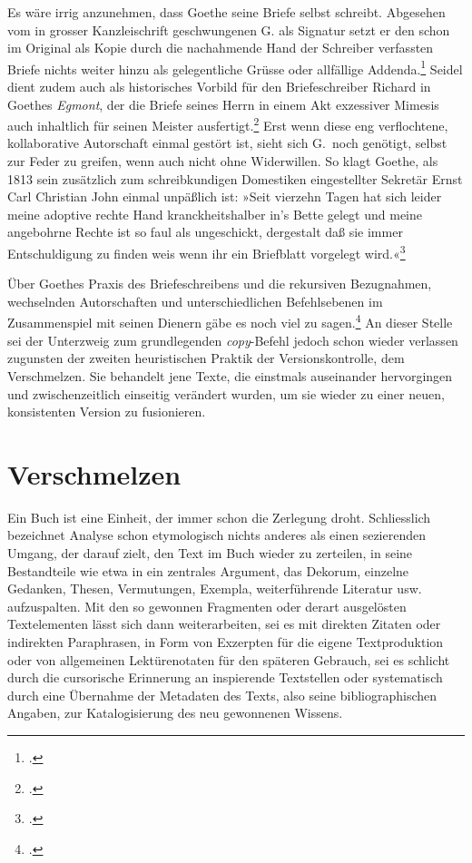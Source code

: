 \documentclass[a4paper,11pt]{article}
\newcommand{\anf}[1]{»#1«}
\begin{document}
Es wäre irrig anzunehmen, dass Goethe seine Briefe selbst schreibt. Abgesehen vom in grosser Kanzleischrift geschwungenen G. als Signatur setzt er den schon im Original als Kopie durch die nachahmende Hand der Schreiber verfassten Briefe nichts weiter hinzu als gelegentliche Grüsse oder allfällige Addenda.\footcite[40]{schleif:1965} Seidel dient zudem auch als historisches Vorbild für den Briefeschreiber Richard in Goethes \emph{Egmont}, der die Briefe seines Herrn in einem Akt exzessiver Mimesis auch inhaltlich für seinen Meister ausfertigt.\footcite[Vgl.][253–256]{krajewski:2010} Erst wenn diese eng verflochtene, kollaborative Autorschaft einmal gestört ist, sieht sich G.\ noch genötigt, selbst zur Feder zu greifen, wenn auch nicht ohne Widerwillen. So klagt Goethe, als 1813 sein zusätzlich zum schreibkundigen Domestiken eingestellter Sekretär Ernst Carl Christian John einmal unpäßlich ist: \anf{Seit vierzehn Tagen hat sich leider meine adoptive rechte Hand kranckheitshalber in's Bette gelegt und meine angebohrne Rechte ist so faul als ungeschickt, dergestalt daß sie immer Entschuldigung zu finden weis wenn ihr ein Briefblatt  vorgelegt wird.}\footcite[][Nachträge: Briefe, Bd.~51, S.~342]{goethe:1887}

Über Goethes Praxis des Briefeschreibens und die rekursiven Bezugnahmen, wechselnden Autorschaften und unterschiedlichen Befehlsebenen im Zusammenspiel mit seinen Dienern gäbe es noch viel zu sagen.\footcites[Vgl.][]{krajewski:2010}[sowie][]{schoene:2015} An dieser Stelle sei der Unterzweig zum grundlegenden \emph{copy}-Befehl jedoch schon wieder verlassen zugunsten der zweiten heuristischen Praktik der Versionskontrolle, dem Verschmelzen. Sie behandelt jene Texte, die einstmals auseinander hervorgingen und zwischenzeitlich einseitig verändert wurden, um sie wieder zu einer neuen, konsistenten Version zu fusionieren. 

\section{Verschmelzen}

Ein Buch ist eine Einheit, der immer schon die Zerlegung droht. Schliesslich bezeichnet Analyse schon etymologisch nichts anderes als einen sezierenden Umgang, der darauf zielt, den Text im Buch wieder zu zerteilen, in seine Bestandteile wie etwa in ein zentrales Argument, das Dekorum, einzelne Gedanken, Thesen, Vermutungen, Exempla, weiterführende Literatur usw. aufzuspalten. %
Mit den so gewonnen Fragmenten oder derart ausgelösten Textelementen lässt sich dann weiterarbeiten, sei es mit direkten Zitaten oder indirekten Paraphrasen, in Form von Exzerpten für die eigene Textproduktion oder von allgemeinen Lektürenotaten für den späteren Gebrauch, sei es schlicht durch die cursorische Erinnerung an inspierende Textstellen oder systematisch durch eine Übernahme der Metadaten des Texts, also seine bibliographischen Angaben, zur Katalogisierung des neu gewonnenen Wissens. 
 
\end{document}
